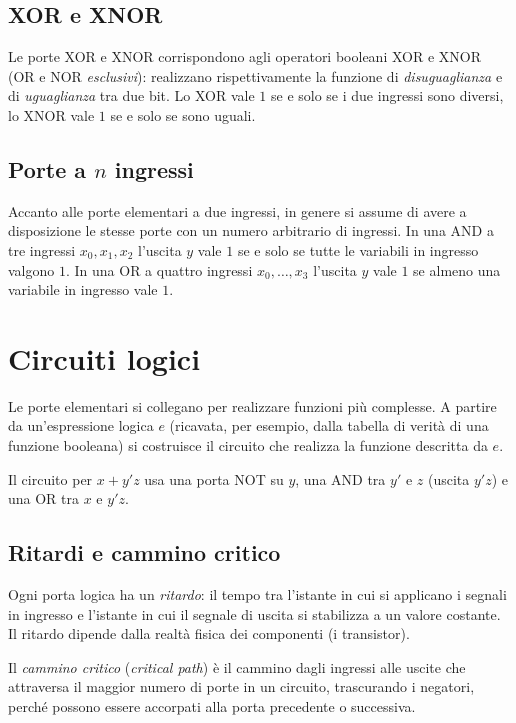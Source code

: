 \documentclass[11pt,a4paper]{article}
\begin{document}
\subsection{XOR e XNOR}

Le porte XOR e XNOR corrispondono agli operatori booleani XOR e XNOR (OR e NOR \emph{esclusivi}): realizzano rispettivamente la funzione di \emph{disuguaglianza} e di \emph{uguaglianza} tra due bit. Lo XOR vale $1$ se e solo se i due ingressi sono diversi, lo XNOR vale $1$ se e solo se sono uguali.

\subsection{Porte a $n$ ingressi}

Accanto alle porte elementari a due ingressi, in genere si assume di avere a disposizione le stesse porte con un numero arbitrario di ingressi. In una AND a tre ingressi $x_0, x_1, x_2$ l'uscita $y$ vale $1$ se e solo se tutte le variabili in ingresso valgono $1$. In una OR a quattro ingressi $x_0, \dots, x_3$ l'uscita $y$ vale $1$ se almeno una variabile in ingresso vale $1$.

\section{Circuiti logici}

Le porte elementari si collegano per realizzare funzioni più complesse. A partire da un'espressione logica $e$ (ricavata, per esempio, dalla tabella di verità di una funzione booleana) si costruisce il circuito che realizza la funzione descritta da $e$.

\begin{esempio}
Il circuito per $x + y'z$ usa una porta NOT su $y$, una AND tra $y'$ e $z$ (uscita $y'z$) e una OR tra $x$ e $y'z$.
\end{esempio}

\subsection{Ritardi e cammino critico}

Ogni porta logica ha un \emph{ritardo}: il tempo tra l'istante in cui si applicano i segnali in ingresso e l'istante in cui il segnale di uscita si stabilizza a un valore costante. Il ritardo dipende dalla realtà fisica dei componenti (i transistor).

\begin{definizione}
Il \emph{cammino critico} (\emph{critical path}) è il cammino dagli ingressi alle uscite che attraversa il maggior numero di porte in un circuito, trascurando i negatori, perché possono essere accorpati alla porta precedente o successiva.
\end{definizione}
\end{document}
